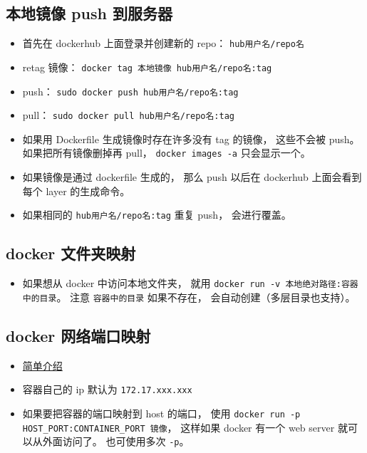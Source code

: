 \subsection{本地镜像 push 到服务器}
\begin{itemize}
\item 首先在 dockerhub 上面登录并创建新的 repo： \verb|hub用户名/repo名|
\item retag 镜像： \verb|docker tag 本地镜像 hub用户名/repo名:tag|
\item push： \verb|sudo docker push hub用户名/repo名:tag|
\item pull： \verb|sudo docker pull hub用户名/repo名:tag|
\item 如果用 Dockerfile 生成镜像时存在许多没有 tag 的镜像， 这些不会被 push。 如果把所有镜像删掉再 pull， \verb|docker images -a| 只会显示一个。
\item 如果镜像是通过 dockerfile 生成的， 那么 push 以后在 dockerhub 上面会看到每个 layer 的生成命令。
\item 如果相同的 \verb|hub用户名/repo名:tag| 重复 push， 会进行覆盖。
\end{itemize}

\subsection{docker 文件夹映射}
\begin{itemize}
\item 如果想从 docker 中访问本地文件夹， 就用 \verb|docker run -v 本地绝对路径:容器中的目录|。 注意 \verb|容器中的目录| 如果不存在， 会自动创建（多层目录也支持）。
\end{itemize}

\subsection{docker 网络端口映射}
\begin{itemize}
\item \href{https://www.freecodecamp.org/news/how-to-get-a-docker-container-ip-address-explained-with-examples/}{简单介绍}
\item 容器自己的 ip 默认为 \verb`172.17.xxx.xxx`
\item 如果要把容器的端口映射到 host 的端口， 使用 \verb`docker run -p HOST_PORT:CONTAINER_PORT 镜像`， 这样如果 docker 有一个 web server 就可以从外面访问了。 也可使用多次 \verb|-p|。
\end{itemize}

